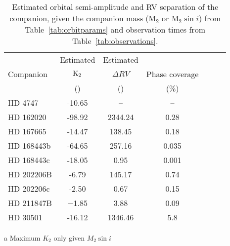 \begin{table*}
        \small
        \centering
       \begin{threeparttable}[b]
        \caption{Estimated orbital semi-amplitude and RV separation of the companion, given the companion mass (\(\textrm{M}_{2}\) or \(\textrm{M}_{2} \sin{i}\)) from Table~\ref{tab:orbitparams} and observation times from Table~\ref{tab:observations}.} 
       \begin{tabular}{l c c c c c c}%
           \toprule
           & Estimated & Estimated & & \\  %
           Companion & \(\rm K_2\) & \(\Delta RV\) & Phase coverage\\
           & (\kmps{}) & (\mps{}) & (\%)\\
           \midrule
           {HD 4747} & -10.65 & -- & --\\  %
           {HD 162020} & -98.92\tnote{a} & 2344.24 & 0.28\\  %
           {HD 167665} & -14.47\tnote{a} & 138.45 & 0.18\\  %
           {HD 168443b} & -64.65\tnote{a}& 257.16 & 0.035\\ 
           {HD 168443c} & -18.05\tnote{a} & 0.95 & 0.001\\  %
           {HD 202206}B & -6.79 & 145.17 & 0.74\\  %
           {HD 202206}c & -2.50 & 0.67 & 0.15\\  %
           {HD 211847}B & $-$1.85 & 3.88 & 0.09\\  %
           {HD 30501} & -16.12 & 1346.46 & 5.8\\
           \bottomrule   
           \end{tabular}
            \label{tab:estimated_rv}
    \begin{tablenotes}
        \item[a] {Maximum \(K_2\) only given \(M_2 \sin{i}\)}
      \end{tablenotes}
  \end{threeparttable}

\end{table*}
